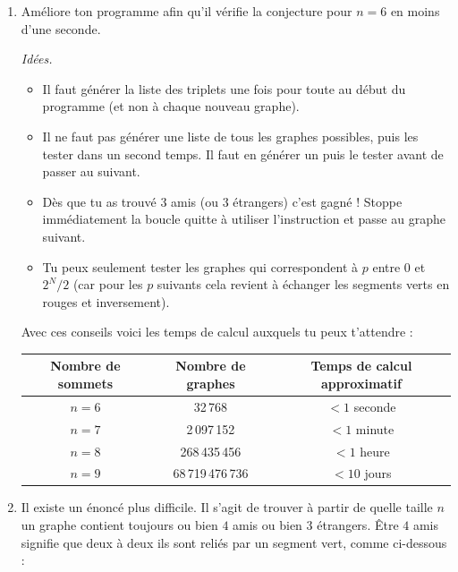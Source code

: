 \documentclass[11pt,class=report,crop=false]{standalone}
\begin{document}
\begin{activite}


\begin{enumerate}
  \item Améliore ton programme afin qu'il vérifie la conjecture pour $n=6$ en moins d'une seconde.
  
  
\emph{Idées.}
  \begin{itemize}
    \item Il faut générer la liste des triplets une fois pour toute au début du programme (et non à chaque nouveau graphe).
    \item Il ne faut pas générer une liste de tous les graphes possibles, puis les tester dans un second temps. Il faut en générer un puis le tester avant de passer au suivant.
    \item Dès que tu as trouvé $3$ amis (ou $3$ étrangers) c'est gagné ! Stoppe immédiatement la boucle quitte à utiliser l'instruction  et passe au graphe suivant.
    \item Tu peux seulement tester les graphes qui correspondent à $p$ entre $0$ et $2^{N}/2$ (car pour les $p$ suivants cela revient à échanger les segments verts en rouges et inversement).
  \end{itemize}
  
\medskip
  
  Avec ces conseils voici les temps de calcul auxquels tu peux t'attendre :
  \begin{center}
  \begin{tabular}{|c|c|c|}
  \hline
  Nombre de sommets & Nombre de graphes & Temps de calcul approximatif \\
  \hline\hline
  $n=6$ & 32\,768 & $< 1$ seconde \\
  $n=7$ & 2\,097\,152 & $< 1$ minute \\  
  $n=8$ & 268\,435\,456 & $< 1$ heure \\
  $n=9$ & 68\,719\,476\,736 & $< 10$ jours \\ 
  \hline
  \end{tabular} 
  \end{center}




 
  \item Il existe un énoncé plus difficile. Il s'agit de trouver à partir de quelle taille $n$ un graphe contient toujours ou bien $4$ amis ou bien $3$ étrangers. 
  \^Etre $4$ amis signifie que deux à deux ils sont reliés par un segment vert, comme ci-dessous :


\end{enumerate}
\end{activite}
\end{document}
